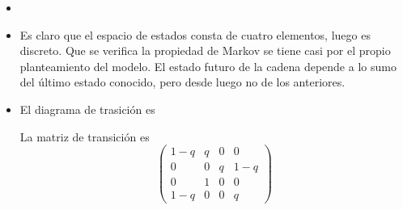 \documentclass[twoside]{article}
\begin{document}
\begin{solucion}

\begin{itemize}
\item[]
\item Es claro que el espacio de estados consta de cuatro elementos, luego es discreto. Que se verifica la propiedad de Markov se tiene casi por el propio planteamiento del modelo. El estado futuro de la cadena depende a lo sumo del último estado conocido, pero desde luego no de los anteriores. 
\item El diagrama de trasición es

\begin{center}
\end{center}
La matriz de transición es
$$
\begin{pmatrix}
1-q	& q & 0 & 0\\
0 	& 0	& q	& 1-q\\
0	& 1 & 0 & 0\\
1-q & 0 & 0 & q
\end{pmatrix}
$$
\end{itemize}
\end{solucion}
\end{document}
